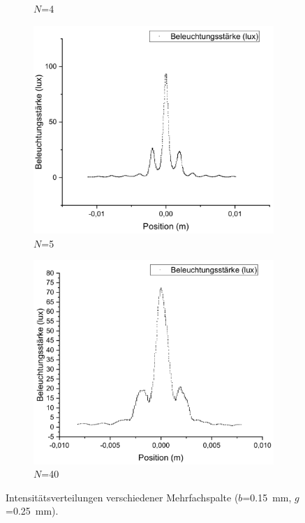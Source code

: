 \documentclass[
	a4paper,
	12pt,
	pagesize,
	ngerman
]{scrartcl}
\begin{document}
\begin{figure}[H]
\begin{subfigure}{.5\textwidth}
			\caption{$N$=4}
		\end{subfigure}
		\begin{subfigure}{.5\textwidth}
			\centering
			\includegraphics[width=1\linewidth]{GitterN5ZOOM}
			\caption{$N$=5}	
		\end{subfigure}%
		\begin{subfigure}{.5\textwidth}
			\centering
			\includegraphics[width=1\linewidth]{GitterN40ZOOM}
			\caption{$N$=40}
		\end{subfigure}
		\caption{Intensitätsverteilungen verschiedener Mehrfachspalte  ($b$=\SI{0,15}{mm}, $g$=\SI{0,25}{mm}).}
		\label{GitterGraphen}
	\end{figure}
\end{document}
